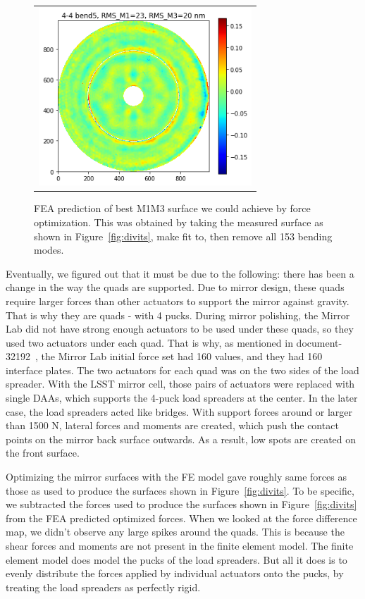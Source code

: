 \documentclass [twoside,openbib,12pt]{article}
\begin{document}
 \begin{figure}[bthp]
   \begin{center}
     \begin{tabular}{c}
\includegraphics[width=80mm]{figures/quads153.png}
  \end{tabular}
   \end{center}
   \caption
   { \label{fig:quads153}
     FEA prediction of best M1M3 surface we could achieve by force optimization.
     This was obtained by taking the measured surface as shown in
     Figure~\ref{fig:divits}, make fit to, then remove all 153 bending modes.
 }
\end{figure}

Eventually, we figured out that it must be due to the following: there
has been a change in the way the quads are supported. Due to mirror
design, these quads require larger forces than other actuators to
support the mirror against gravity. That is why they are quads - with
4 pucks.
During mirror polishing, the Mirror Lab did not have strong enough
actuators to be used under these quads, so they used two actuators
under each quad. That is why, as mentioned in document-32192~\cite{m1m3initF}, the
Mirror Lab initial force set had 160 values, and they had 160
interface plates. The two actuators for each quad was on the two sides
of the load spreader. With the LSST mirror cell, those pairs of
actuators were replaced with single DAAs, which supports the 4-puck
load spreaders at the center. In the later case, the load spreaders
acted like bridges. With support forces around or larger than 1500 N,
lateral forces and moments are created, which push the contact points
on the mirror back surface outwards. As a result, low spots are
created on the front surface.

Optimizing the mirror surfaces with the FE model gave roughly same
forces as those as used to produce the surfaces shown in
Figure~\ref{fig:divits}.
To be specific, we subtracted the forces used to produce the surfaces shown in
Figure~\ref{fig:divits} from the FEA predicted optimized forces.
When we looked at the force difference map, we didn't observe any
large spikes around the quads.
This is because the shear forces and moments are not present in the finite
element model. The finite element model does model the pucks of the
load spreaders. But all it does is to evenly distribute the forces
applied by individual actuators onto the pucks, by treating the load
spreaders as perfectly rigid.
\end{document}
